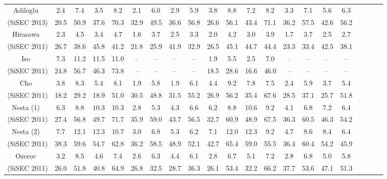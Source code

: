 \documentclass{article}
\begin{document}
\begin{table*}[t]
\begin{center}
{\begin{tabular}{|c|cccc|cccc|cccc|cccc|cccc|}
			\multirow{1}{*}{Adiloglu~\cite{Adiloglu}}		&	2.4	&	7.4	&	3.5	&	8.2			&	2.1	&	6.0	&	2.9	&	5.9			&	3.8	&	8.8	&	7.2	&	8.2		&	3.3	&	7.1	&	5.6	&	6.3	\\
			\multirow{1}{*}{(SiSEC 2013)}			&	20.5	&	50.9	&	37.6	&	70.3			&	32.9	&	49.5	&	36.6	&	56.8			&	26.6	&	56.1	&	43.4	&	71.1		&	36.2	&	57.5	&	42.6	&	56.2	\\ \hline
			\multirow{1}{*}{Hirasawa~\cite{Hirasawa}}	&	2.3	&	4.5	&	3.4	&	4.7			&	1.6	&	3.7	&	2.5	&	3.3			&	2.0	&	4.2	&	3.0	&	3.9		&	1.7	&	3.7	&	2.5	&	2.7	\\
			\multirow{1}{*}{(SiSEC 2011)}			&	26.7	&	38.6	&	45.8	&	41.2			&	21.8	&	25.9	&	41.9	&	32.9			&	26.5	&	45.1	&	44.7	&	44.4		&	23.3	&	33.4	&	42.5	&	38.1	\\ \hline
			\multirow{1}{*}{Iso~\cite{Iso}}				&	7.3	&	11.2	&	11.5	&	11.0			&	--	&	--	&	--	&	--			&	1.9	&	5.5	&	2.5	&	7.0		&	--	&	--	&	--	&	--	\\
			\multirow{1}{*}{(SiSEC 2011)}			&	24.8	&	56.7	&	46.3	&	73.8			&	--	&	--	&	--	&	--			&	18.5	&	28.6	&	16.6	&	46.0		&	--	&	--	&	--	&	--	\\ \hline
			\multirow{1}{*}{Cho~\cite{Cho2}}			&	3.8	&	8.3	&	5.4	&	8.1			&	1.9	&	5.8	&	1.9	&	6.1			&	4.4	&	9.2	&	7.8	&	7.5		&	2.4	&	5.9	&	3.7	&	5.4	\\
			\multirow{1}{*}{(SiSEC 2011)}			&	18.2	&	29.2	&	18.9	&	51.0			&	30.5	&	48.8	&	31.5	&	55.2			&	26.9	&	56.2	&	35.4	&	67.6		&	28.5	&	37.1	&	25.7	&	51.8	\\ \hline
			\multirow{1}{*}{Nesta (1)~\cite{Nesta}}	&	6.3	&	8.8	&	10.3	&	10.3			&	2.8	&	5.3	&	4.3	&	6.6			&	6.2	&	8.8	&	10.6	&	9.2		&	4.1	&	6.8	&	7.2	&	6.4	\\
			\multirow{1}{*}{(SiSEC 2011)}			&	27.4	&	56.8	&	49.7	&	71.7			&	35.9	&	59.0	&	43.7	&	56.5			&	32.7	&	60.9	&	48.9	&	67.5		&	36.3	&	60.5	&	46.3	&	54.2	\\ \hline
			\multirow{1}{*}{Nesta (2)~\cite{Nesta}}	&	7.7	&	12.1	&	12.3	&	10.7			&	3.0	&	6.8	&	5.3	&	6.2			&	7.1	&	12.0	&	12.3	&	9.2		&	4.7	&	8.6	&	8.4	&	6.4	\\
			\multirow{1}{*}{(SiSEC 2011)}			&	38.3	&	59.6	&	54.7	&	62.8			&	36.2	&	58.5	&	48.9	&	52.1			&	42.7	&	65.4	&	59.0	&	55.5		&	36.4	&	60.4	&	54.2	&	45.9	\\ \hline
			\multirow{1}{*}{Ozerov~\cite{Ozerov}}		&	3.2	&	8.5	&	4.6	&	7.4			&	2.6	&	6.3	&	4.4	&	6.1			&	2.8	&	6.7	&	5.1	&	7.2		&	2.8	&	6.8	&	5.0	&	5.8	\\
			\multirow{1}{*}{(SiSEC 2011)}			&	26.0	&	51.8	&	40.8	&	64.9			&	26.8	&	32.5	&	28.7	&	36.3			&	26.1	&	53.4	&	32.2	&	66.2		&	37.7	&	53.6	&	47.1	&	51.3	\\ \hline
		\end{tabular}
	}
	\end{center}
	\label{UND-test-130ms-1m}
\end{table*}
\end{document}
